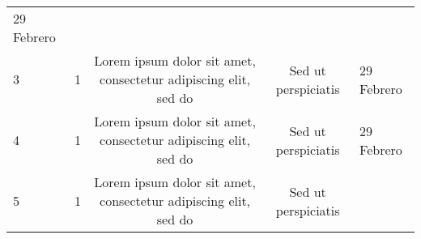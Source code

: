 \documentclass[]{book}
\begin{document}
\begin{longtable}[]{@{}lcccl@{}}
\begin{minipage}[t]{0.11\columnwidth}
29 Febrero\strut
\end{minipage}\tabularnewline
\begin{minipage}[t]{0.03\columnwidth}\raggedright\strut
3\strut
\end{minipage} & \begin{minipage}[t]{0.23\columnwidth}\centering\strut
1\strut
\end{minipage} & \begin{minipage}[t]{0.37\columnwidth}\centering\strut
Lorem ipsum dolor sit amet, consectetur adipiscing elit, sed do\strut
\end{minipage} & \begin{minipage}[t]{0.12\columnwidth}\centering\strut
Sed ut perspiciatis\strut
\end{minipage} & \begin{minipage}[t]{0.11\columnwidth}\raggedright\strut
29 Febrero\strut
\end{minipage}\tabularnewline
\begin{minipage}[t]{0.03\columnwidth}\raggedright\strut
4\strut
\end{minipage} & \begin{minipage}[t]{0.23\columnwidth}\centering\strut
1\strut
\end{minipage} & \begin{minipage}[t]{0.37\columnwidth}\centering\strut
Lorem ipsum dolor sit amet, consectetur adipiscing elit, sed do\strut
\end{minipage} & \begin{minipage}[t]{0.12\columnwidth}\centering\strut
Sed ut perspiciatis\strut
\end{minipage} & \begin{minipage}[t]{0.11\columnwidth}\raggedright\strut
29 Febrero\strut
\end{minipage}\tabularnewline
\begin{minipage}[t]{0.03\columnwidth}\raggedright\strut
5\strut
\end{minipage} & \begin{minipage}[t]{0.23\columnwidth}\centering\strut
1\strut
\end{minipage} & \begin{minipage}[t]{0.37\columnwidth}\centering\strut
Lorem ipsum dolor sit amet, consectetur adipiscing elit, sed do\strut
\end{minipage} & \begin{minipage}[t]{0.12\columnwidth}\centering\strut
Sed ut perspiciatis\strut
\end{minipage} & \begin{minipage}[t]{0.11\columnwidth}\raggedright\strut

\end{minipage}
\end{longtable}
\end{document}
